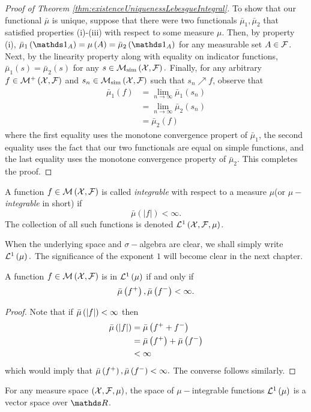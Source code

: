 \begin{proof}[Proof of Theorem \ref{thm:existenceUniquenessLebesgueIntegral}]
To show that our functional $\bar{\mu}$ is unique, suppose that there
were two functionals $\bar{\mu}_{1},\bar{\mu}_{2}$ that satisfied
properties (i)-(iii) with respect to some measure $\mu.$ Then, by
property (i), $\bar{\mu}_{1}\left(\indicate_{A}\right)=\mu\left(A\right)=\bar{\mu}_{2}\left(\indicate_{A}\right)$
for any measurable set $A\in\mathcal{F}$. Next, by the linearity property
along with equality on indicator functions, $\bar{\mu}_{1}\left(s\right)=\bar{\mu}_{2}\left(s\right)$
for any $s\in\mathcal{M}_{\textnormal{sim}}\left(\mathcal{X},\mathcal{F}\right).$ Finally,
for any arbitrary $f\in\mathcal{M}^{+}\left(\mathcal{X},\mathcal{F}\right)$ and $s_{n}\in\mathcal{M}_{\textnormal{sim}}\left(\mathcal{X},\mathcal{F}\right)$
such that $s_{n}\nearrow f$, observe that
\begin{align*}
\bar{\mu}_{1}\left(f\right) & =\lim_{n\to\infty}\bar{\mu}_{1}\left(s_{n}\right)\\
 & =\lim_{n\to\infty}\bar{\mu}_{2}\left(s_{n}\right)\\
 & =\bar{\mu}_{2}\left(f\right)
\end{align*}
where the first equality uses the monotone convergence propert of
$\bar{\mu}_{1}$, the second equality uses the fact that our two functionals
are equal on simple functions, and the last equality uses the monotone
convergence property of $\bar{\mu}_{2}$. This completes the proof.
\end{proof}
\begin{defn}
\label{def:integrable}A function $f\in\mathcal{M}\left(\mathcal{X},\mathcal{F}\right)$
is called \emph{integrable }with respect to a measure $\mu$(or $\mu-$\emph{integrable
}in short) if 
\[
\bar{\mu}\left(\left|f\right|\right)<\infty.
\]
The collection of all such functions is denoted $\mathcal{L}^{1}\left(\mathcal{X},\mathcal{F},\mu\right)$.
\end{defn}

When the underlying space and $\sigma-$algebra are clear, we shall
simply write $\mathcal{L}^{1}\left(\mu\right).$ The significance of the exponent $1$
will become clear in the next chapter.
\begin{prop}
\label{prop:L1conditions}A function $f\in\mathcal{M}\left(\mathcal{X},\mathcal{F}\right)$ is
in $\mathcal{L}^{1}\left(\mu\right)$ if and only if 
\[
\bar{\mu}\left(f^{+}\right),\bar{\mu}\left(f^{-}\right)<\infty.
\]
\end{prop}

\begin{proof}
Note that if $\bar{\mu}\left(\left|f\right|\right)<\infty$ then
\begin{align*}
\bar{\mu}\left(\left|f\right|\right) & =\bar{\mu}\left(f^{+}+f^{-}\right)\\
 & =\bar{\mu}\left(f^{+}\right)+\bar{\mu}\left(f^{-}\right)\\
 & <\infty
\end{align*}
which would imply that $\bar{\mu}\left(f^{+}\right),\bar{\mu}\left(f^{-}\right)<\infty.$
The converse follows similarly.
\end{proof}
\begin{prop}
\label{prop:L1VectorSpace}For any measure space $\left(\mathcal{X},\mathcal{F},\mu\right)$,
the space of $\mu-$integrable functions $\mathcal{L}^{1}\left(\mu\right)$ is a vector
space over $\R$.
\end{prop}

